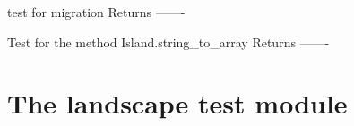 \documentclass[a4paper,10pt,english]{sphinxmanual}
\begin{document}
\begin{fulllineitems}
\begin{fulllineitems}
\end{fulllineitems}


\begin{fulllineitems}
\label{\detokenize{tests:biosim.tests.test_island.TestIsland.test_migration}}
test for migration
Returns
-------

\end{fulllineitems}


\begin{fulllineitems}
\label{\detokenize{tests:biosim.tests.test_island.TestIsland.test_string_to_array}}
Test for the method Island.string\_to\_array
Returns
-------

\end{fulllineitems}


\end{fulllineitems}



\section{The landscape test module}
\label{\detokenize{tests:the-landscape-test-module}}\label{\detokenize{tests:module-biosim.tests.test_landscape}}
\end{document}
